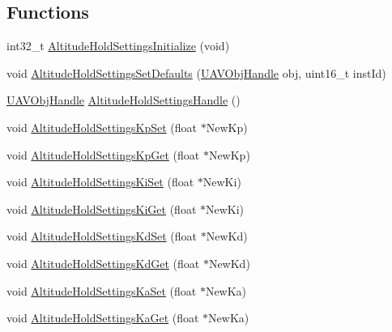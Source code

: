 \subsection*{\-Functions}
\begin{DoxyCompactItemize}
\item 
int32\-\_\-t \hyperlink{group___altitude_hold_settings_gac54777bcc017597b3127f3e070615b7b}{\-Altitude\-Hold\-Settings\-Initialize} (void)
\item 
void \hyperlink{group___altitude_hold_settings_gaaf5a01b8be0203ec676a762c95fb1a23}{\-Altitude\-Hold\-Settings\-Set\-Defaults} (\hyperlink{targets_2_u_a_v_objects_2inc_2uavobjectmanager_8h_a279053e22be53ce9f895043aaeb91e3b}{\-U\-A\-V\-Obj\-Handle} obj, uint16\-\_\-t inst\-Id)
\item 
\hyperlink{targets_2_u_a_v_objects_2inc_2uavobjectmanager_8h_a279053e22be53ce9f895043aaeb91e3b}{\-U\-A\-V\-Obj\-Handle} \hyperlink{group___altitude_hold_settings_ga81ff457589a2ec421ae2f7e235610a2f}{\-Altitude\-Hold\-Settings\-Handle} ()
\item 
void \hyperlink{group___altitude_hold_settings_ga9ad74a151dafd855efefed23917463bb}{\-Altitude\-Hold\-Settings\-Kp\-Set} (float $\ast$\-New\-Kp)
\item 
void \hyperlink{group___altitude_hold_settings_ga07e3361ce68b652ba8a4e37804387bca}{\-Altitude\-Hold\-Settings\-Kp\-Get} (float $\ast$\-New\-Kp)
\item 
void \hyperlink{group___altitude_hold_settings_ga547a7183dc91b6b74095d1523292f42d}{\-Altitude\-Hold\-Settings\-Ki\-Set} (float $\ast$\-New\-Ki)
\item 
void \hyperlink{group___altitude_hold_settings_ga79a1c1d5f749a7a36c0f5bbb64ae4015}{\-Altitude\-Hold\-Settings\-Ki\-Get} (float $\ast$\-New\-Ki)
\item 
void \hyperlink{group___altitude_hold_settings_ga2677168f5065c82e9960109168606224}{\-Altitude\-Hold\-Settings\-Kd\-Set} (float $\ast$\-New\-Kd)
\item 
void \hyperlink{group___altitude_hold_settings_gad6069bcf40de36a143607777c8ca2cc5}{\-Altitude\-Hold\-Settings\-Kd\-Get} (float $\ast$\-New\-Kd)
\item 
void \hyperlink{group___altitude_hold_settings_ga6c012f0c46e35f39891dbe371c0a1d4e}{\-Altitude\-Hold\-Settings\-Ka\-Set} (float $\ast$\-New\-Ka)
\item 
void \hyperlink{group___altitude_hold_settings_gaa7525a2d4fbe9586b13f083a59186e35}{\-Altitude\-Hold\-Settings\-Ka\-Get} (float $\ast$\-New\-Ka)
\item 

\end{DoxyCompactItemize}
